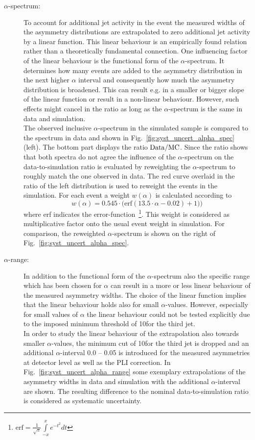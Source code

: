 \begin{description}
 \item[$\alpha$-spectrum:] To account for additional jet activity in the event the measured widths of the asymmetry distributions are extrapolated to zero additional jet activity by a linear function. This linear behaviour is an empirically found relation rather than a theoretically fundamental connection. One influencing factor of the linear behaviour is the functional form of the $\alpha$-spectrum. It determines how many events are added to the asymmetry distribution in the next higher $\alpha$ interval and consequently how much the asymmetry distribution is broadened. This can result e.g. in a smaller or bigger slope of the linear function or result in a non-linear behaviour. However, such effects might cancel in the ratio as long as the $\alpha$-spectrum is the same in data and simulation. \\
 The observed inclusive $\alpha$-spectrum in the simulated sample is compared to the spectrum in data and shown in Fig.~\ref{fig:syst_uncert_alpha_spec} (left). The bottom part displays the ratio $\rm{Data/MC}$. Since the ratio shows that both spectra do not agree the influence of the $\alpha$-spectrum on the data-to-simulation ratio is evaluated by reweighting the $\alpha$-spectrum to roughly match the one observed in data. The red curve overlaid in the ratio of the left distribution is used to reweight the events in the simulation. For each event a weight $w(\alpha)$ is calculated according to 
\begin{equation}
w(\alpha) = 0.545 \cdot \mathrm{(erf}(13.5 \cdot \alpha -0.02) +1))
\end{equation}
where erf indicates the error-function~\footnote{ $\mathrm{erf} = \frac{1}{\sqrt{\pi}} \int\limits_{-x}^{x} e^{-t^2} dt$}. This weight is considered as multiplicative factor onto the usual event weight in simulation. For comparison, the reweighted $\alpha$-spectrum is shown on the right of Fig.~\ref{fig:syst_uncert_alpha_spec}.
 
 \item[$\alpha$-range:] In addition to the functional form of the $\alpha$-spectrum also the specific range which has been chosen for $\alpha$ can result in a more or less linear behaviour of the measured asymmetry widths. The choice of the linear function implies that the linear behaviour holds also for small $\alpha$-values. However, especially for small values of $\alpha$ the linear behaviour could not be tested explicitly due to the imposed minimum \pt threshold of 10\gev for the third jet. \\
In order to study the linear behaviour of the extrapolation also towards smaller $\alpha$-values, the minimum \pt cut of 10\gev for the third jet is dropped and an additional $\alpha$-interval 0.0 -- 0.05 is introduced for the measured asymmetries at detector level as well as the PLI correction. In Fig.~\ref{fig:syst_uncert_alpha_range} some exemplary extrapolations of the asymmetry widths in data and simulation with the additional $\alpha$-interval are shown. The resulting difference to the nominal data-to-simulation ratio is considered as systematic uncertainty.


\end{description}

